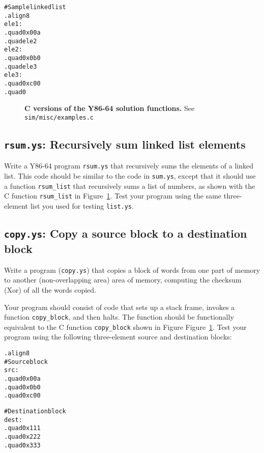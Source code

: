 \documentclass[11pt]{article}
\newcommand{\mycaption}[2]{\caption[#1]{\small \textsf{\textbf{#1} #2}}}
\newenvironment{ccode}%
{\small}%
{}
\newenvironment{codefrag}%
{\small\begin{alltt}}%
{\end{alltt}%
}
\begin{document}
\begin{codefrag}
# Sample linked list
.align 8
ele1:
        .quad 0x00a
        .quad ele2
ele2:
        .quad 0x0b0
        .quad ele3
ele3:
        .quad 0xc00
        .quad 0
\end{codefrag} 

\begin{figure}
\begin{ccode}

\end{ccode}
\mycaption{C versions of the Y86-64 solution functions.}
{See \texttt{sim/misc/examples.c}}
\label{fig:examples}
\end{figure}

\subsection*{\texttt{rsum.ys}: Recursively sum linked list elements}

Write a Y86-64 program 
\texttt{rsum.ys} that recursively sums the elements of a linked
list.  This code should be similar to the code in \texttt{sum.ys},
except that it should use a function \texttt{rsum\_list} that
recursively sums a list of numbers, as shown with the C function
\texttt{rsum\_list} in 
Figure~\ref{fig:examples}.  Test your
program using the same three-element list you used for testing
\texttt{list.ys}.

\subsection*{\texttt{copy.ys}: Copy a source block to a destination block}

Write a program (\texttt{copy.ys}) that copies a block of words
from one part of memory to another (non-overlapping area) area of
memory, computing the checksum (Xor) of all the words copied.

Your program should consist of code that sets up a stack frame,
invokes a function \texttt{copy\_block}, and then halts.  The function
should be functionally equivalent to the C function
\texttt{copy\_block} shown in Figure
Figure~\ref{fig:examples}.  Test your
program using the following three-element source and destination
blocks:

\begin{codefrag}
.align 8
# Source block
src:
        .quad 0x00a
        .quad 0x0b0
        .quad 0xc00

# Destination block
dest:
        .quad 0x111
        .quad 0x222
        .quad 0x333
\end{codefrag}
\end{document}
